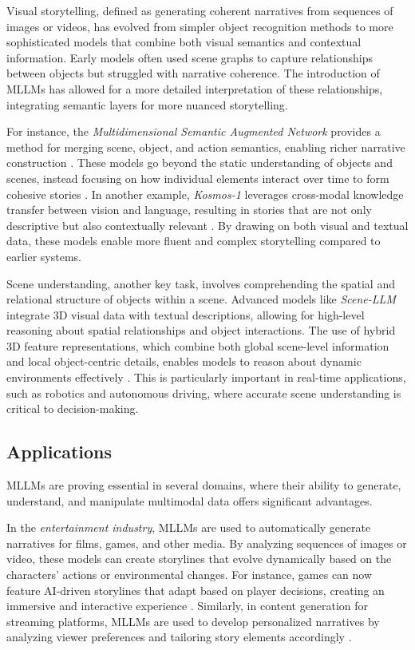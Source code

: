 Visual storytelling, defined as generating coherent narratives from sequences of images or videos, has evolved from simpler object recognition methods to more sophisticated models that combine both visual semantics and contextual information. Early models often used scene graphs to capture relationships between objects but struggled with narrative coherence. The introduction of MLLMs has allowed for a more detailed interpretation of these relationships, integrating semantic layers for more nuanced storytelling.

For instance, the \textit{Multidimensional Semantic Augmented Network} provides a method for merging scene, object, and action semantics, enabling richer narrative construction \cite{vs2024li}. These models go beyond the static understanding of objects and scenes, instead focusing on how individual elements interact over time to form cohesive stories \cite{vs2024li}. In another example, \textit{Kosmos-1} leverages cross-modal knowledge transfer between vision and language, resulting in stories that are not only descriptive but also contextually relevant \cite{vs2024song}. By drawing on both visual and textual data, these models enable more fluent and complex storytelling compared to earlier systems.

Scene understanding, another key task, involves comprehending the spatial and relational structure of objects within a scene. Advanced models like \textit{Scene-LLM} integrate 3D visual data with textual descriptions, allowing for high-level reasoning about spatial relationships and object interactions. The use of hybrid 3D feature representations, which combine both global scene-level information and local object-centric details, enables models to reason about dynamic environments effectively \cite{vs2024rao}. This is particularly important in real-time applications, such as robotics and autonomous driving, where accurate scene understanding is critical to decision-making.

\subsection{Applications}

MLLMs are proving essential in several domains, where their ability to generate, understand, and manipulate multimodal data offers significant advantages.

In the \textit{entertainment industry}, MLLMs are used to automatically generate narratives for films, games, and other media. By analyzing sequences of images or video, these models can create storylines that evolve dynamically based on the characters' actions or environmental changes. For instance, games can now feature AI-driven storylines that adapt based on player decisions, creating an immersive and interactive experience \cite{vs2020parde}. Similarly, in content generation for streaming platforms, MLLMs are used to develop personalized narratives by analyzing viewer preferences and tailoring story elements accordingly \cite{vs2024song}.

